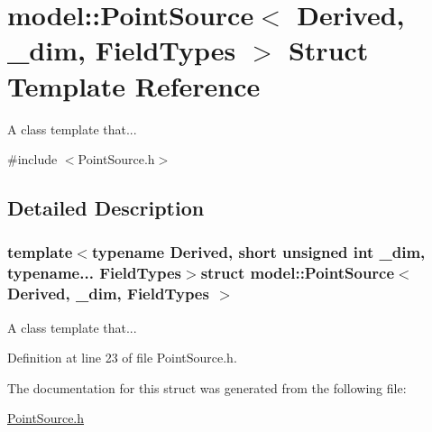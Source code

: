 \hypertarget{structmodel_1_1_point_source}{}\section{model\+:\+:Point\+Source$<$ Derived, \+\_\+dim, Field\+Types $>$ Struct Template Reference}
\label{structmodel_1_1_point_source}


A class template that...  




{\ttfamily \#include $<$Point\+Source.\+h$>$}



\subsection{Detailed Description}
\subsubsection*{template$<$typename Derived, short unsigned int \+\_\+dim, typename... Field\+Types$>$struct model\+::\+Point\+Source$<$ Derived, \+\_\+dim, Field\+Types $>$}

A class template that... 

Definition at line 23 of file Point\+Source.\+h.



The documentation for this struct was generated from the following file\+:\begin{DoxyCompactItemize}
\item 
\hyperlink{_point_source_8h}{Point\+Source.\+h}\end{DoxyCompactItemize}
